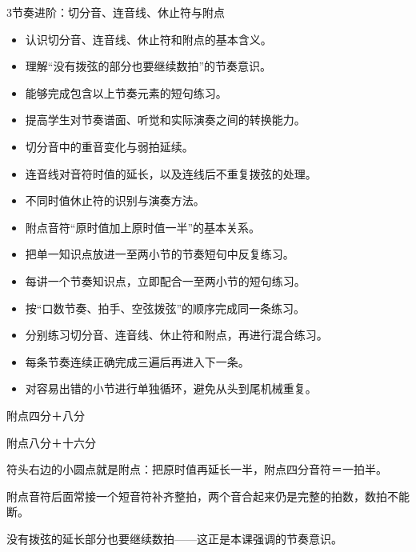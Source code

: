 \begin{lessoncard}{3}{节奏进阶：切分音、连音线、休止符与附点}
\begin{itemize}
\item 认识切分音、连音线、休止符和附点的基本含义。
\item 理解“没有拨弦的部分也要继续数拍”的节奏意识。
\item 能够完成包含以上节奏元素的短句练习。
\item 提高学生对节奏谱面、听觉和实际演奏之间的转换能力。
\end{itemize}
\begin{itemize}
\item 切分音中的重音变化与弱拍延续。
\item 连音线对音符时值的延长，以及连线后不重复拨弦的处理。
\item 不同时值休止符的识别与演奏方法。
\item 附点音符“原时值加上原时值一半”的基本关系。
\item 把单一知识点放进一至两小节的节奏短句中反复练习。
\end{itemize}
\begin{itemize}
\item 每讲一个节奏知识点，立即配合一至两小节的短句练习。
\item 按“口数节奏、拍手、空弦拨弦”的顺序完成同一条练习。
\item 分别练习切分音、连音线、休止符和附点，再进行混合练习。
\item 每条节奏连续正确完成三遍后再进入下一条。
\item 对容易出错的小节进行单独循环，避免从头到尾机械重复。
\end{itemize}
\begin{fignote}
\begin{center}
\begin{rpattern}{附点四分＋八分}\end{rpattern}\hspace{12mm}%
\begin{rpattern}{附点八分＋十六分}\end{rpattern}
\end{center}
\begin{fignotes}
\item 符头右边的小圆点就是附点：把原时值再延长一半，附点四分音符＝一拍半。
\item 附点音符后面常接一个短音符补齐整拍，两个音合起来仍是完整的拍数，数拍不能断。
\item 没有拨弦的延长部分也要继续数拍——这正是本课强调的节奏意识。
\end{fignotes}
\end{fignote}
\end{lessoncard}

